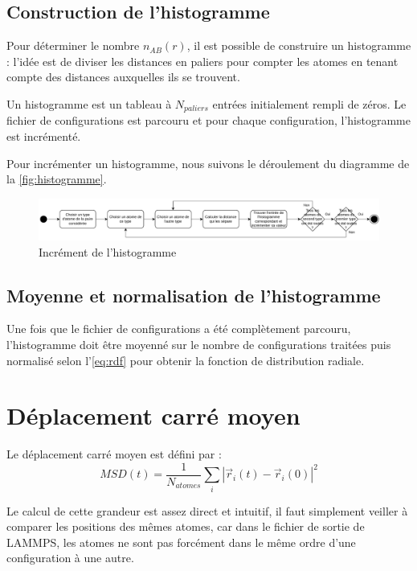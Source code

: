 \documentclass[11pt, a4paper]{article}
\begin{document}
	\subsection{Construction de l'histogramme}

Pour déterminer le nombre $n_{AB}(r)$, il est possible de construire un histogramme : l'idée est de diviser les distances en paliers pour compter les atomes en tenant compte des distances auxquelles ils se trouvent.

Un histogramme est un tableau à $N_{paliers}$ entrées initialement rempli de zéros. Le fichier de configurations est parcouru et pour chaque configuration, l'histogramme est incrémenté.

Pour incrémenter un histogramme, nous suivons le déroulement du diagramme de la \autoref{fig:histogramme}.

\begin{figure}[hpbt]
	\centering
	\includegraphics[width=\linewidth]{demarche-histogramme.pdf}
	\caption{Incrément de l'histogramme}
	\label{fig:histogramme}
\end{figure}

	\subsection{Moyenne et normalisation de l'histogramme}

Une fois que le fichier de configurations a été complètement parcouru, l'histogramme doit être moyenné sur le nombre de configurations traitées puis normalisé selon l'\autoref{eq:rdf} pour obtenir la fonction de distribution radiale.

\section{Déplacement carré moyen}

Le déplacement carré moyen est défini par :
\begin{equation*}
	\boxed%
	{
		MSD (t) = \frac{1}{N_{atomes}} \sum_i \left| \vec{r}_i (t) - \vec{r}_i (0) \right|^2
	}
\end{equation*}

Le calcul de cette grandeur est assez direct et intuitif, il faut simplement veiller à comparer les positions des mêmes atomes, car dans le fichier de sortie de LAMMPS, les atomes ne sont pas forcément dans le même ordre d'une configuration à une autre.
\end{document}
